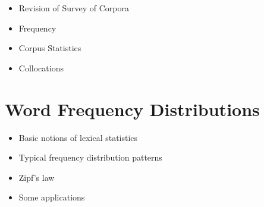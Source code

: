\documentclass[a4paper,landscape,headrule,footrule,xetex]{foils}
\begin{document}

\maketitle



\begin{itemize} 
\item Revision  of Survey of Corpora
\item Frequency
\item Corpus Statistics
\item Collocations
\end{itemize}





\section{Word Frequency Distributions}



\begin{itemize}
\item Basic notions of lexical statistics
\item Typical frequency distribution patterns
\item Zipf's law
\item Some applications
\end{itemize}

\end{document}
